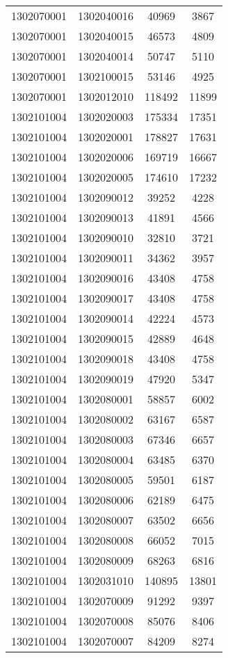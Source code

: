 \begin{longtable}{llcc}
1302070001 & 1302040016 & 40969 & 3867\\
1302070001 & 1302040015 & 46573 & 4809\\
1302070001 & 1302040014 & 50747 & 5110\\
1302070001 & 1302100015 & 53146 & 4925\\
1302070001 & 1302012010 & 118492 & 11899\\
1302101004 & 1302020003 & 175334 & 17351\\
1302101004 & 1302020001 & 178827 & 17631\\
1302101004 & 1302020006 & 169719 & 16667\\
1302101004 & 1302020005 & 174610 & 17232\\
1302101004 & 1302090012 & 39252 & 4228\\
1302101004 & 1302090013 & 41891 & 4566\\
1302101004 & 1302090010 & 32810 & 3721\\
1302101004 & 1302090011 & 34362 & 3957\\
1302101004 & 1302090016 & 43408 & 4758\\
1302101004 & 1302090017 & 43408 & 4758\\
1302101004 & 1302090014 & 42224 & 4573\\
1302101004 & 1302090015 & 42889 & 4648\\
1302101004 & 1302090018 & 43408 & 4758\\
1302101004 & 1302090019 & 47920 & 5347\\
1302101004 & 1302080001 & 58857 & 6002\\
1302101004 & 1302080002 & 63167 & 6587\\
1302101004 & 1302080003 & 67346 & 6657\\
1302101004 & 1302080004 & 63485 & 6370\\
1302101004 & 1302080005 & 59501 & 6187\\
1302101004 & 1302080006 & 62189 & 6475\\
1302101004 & 1302080007 & 63502 & 6656\\
1302101004 & 1302080008 & 66052 & 7015\\
1302101004 & 1302080009 & 68263 & 6816\\
1302101004 & 1302031010 & 140895 & 13801\\
1302101004 & 1302070009 & 91292 & 9397\\
1302101004 & 1302070008 & 85076 & 8406\\
1302101004 & 1302070007 & 84209 & 8274\\

\end{longtable}

